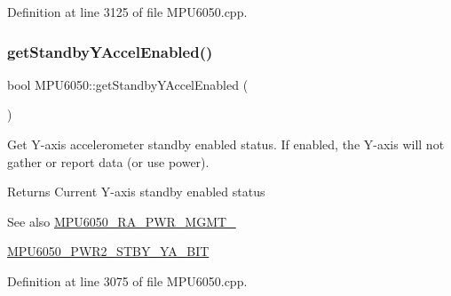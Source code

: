 Definition at line 3125 of file M\+P\+U6050.\+cpp.


\begin{DoxyCode}{0}

\end{DoxyCode}
\mbox{\label{classMPU6050_a104f2ec438d745f8fdeec202bae09b48}} 
\subsubsection{\texorpdfstring{getStandbyYAccelEnabled()}{getStandbyYAccelEnabled()}}
{\footnotesize\ttfamily bool M\+P\+U6050\+::get\+Standby\+Y\+Accel\+Enabled (\begin{DoxyParamCaption}{ }\end{DoxyParamCaption})}

Get Y-\/axis accelerometer standby enabled status. If enabled, the Y-\/axis will not gather or report data (or use power). \begin{DoxyReturn}{Returns}
Current Y-\/axis standby enabled status 
\end{DoxyReturn}
\begin{DoxySeeAlso}{See also}
\mbox{\hyperlink{MPU6050_8h_aace6ce286da4d5f8c8f5ba6f80688e13}{M\+P\+U6050\+\_\+\+R\+A\+\_\+\+P\+W\+R\+\_\+\+M\+G\+M\+T\+\_}} 

\mbox{\hyperlink{MPU6050_8h_affa59453badce23273e2a6470da072d3}{M\+P\+U6050\+\_\+\+P\+W\+R2\+\_\+\+S\+T\+B\+Y\+\_\+\+Y\+A\+\_\+\+B\+IT}} 
\end{DoxySeeAlso}


Definition at line 3075 of file M\+P\+U6050.\+cpp.


